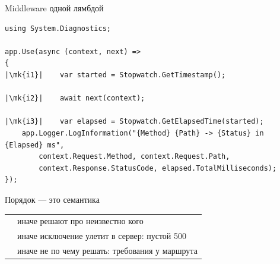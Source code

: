 \documentclass[aspectratio=169,10pt,t]{beamer}
\newcommand{\codesm}{\ttfamily\fontsize{7.6}{9.0}\selectfont}
\newcommand{\mk}[1]{\tikz[remember picture,overlay]\coordinate (#1) at (0,0.55ex);}
\begin{document}
\begin{frame}[fragile]{Middleware одной лямбдой}
  \vspace{0.3em}
\begin{lstlisting}[style=csharp,basicstyle=\codesm,escapechar=|]
using System.Diagnostics;

app.Use(async (context, next) =>
{
|\mk{i1}|    var started = Stopwatch.GetTimestamp();

|\mk{i2}|    await next(context);

|\mk{i3}|    var elapsed = Stopwatch.GetElapsedTime(started);
    app.Logger.LogInformation("{Method} {Path} -> {Status} in {Elapsed} ms",
        context.Request.Method, context.Request.Path,
        context.Response.StatusCode, elapsed.TotalMilliseconds);
});
\end{lstlisting}

  \vspace{0.2em}
\end{frame}

\begin{frame}{Порядок --- это семантика}
  \slidetop

  {\renewcommand{\arraystretch}{1.6}
  \begin{tabular}{@{}L{5.4cm}L{7.4cm}@{}}
     & иначе решают про неизвестно
      кого \\
               & иначе исключение улетит в сервер:
      пустой 500 \\
      & иначе не по чему решать:
      требования у маршрута \\
  \end{tabular}}

  \slidegap
\end{frame}
\end{document}
